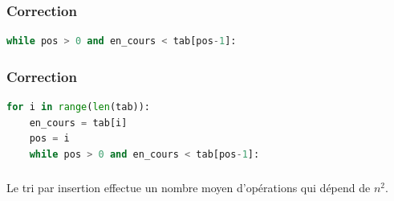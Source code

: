 \documentclass[svgnames,11pt]{beamer}
\begin{document}
\begin{frame}[fragile]
    \frametitle{Correction}

    \begin{center}
        \begin{lstlisting}[language=Python, basicstyle=\small, xrightmargin=1em]
while pos > 0 and en_cours < tab[pos-1]:
        \end{lstlisting}
        \end{center}
    \begin{center}
        \label{CODE}
        \end{center}

\end{frame}

\begin{frame}[fragile]
    \frametitle{Correction}

\begin{center}
\begin{lstlisting}[language=Python, basicstyle=\small, xrightmargin=1em]
for i in range(len(tab)):
    en_cours = tab[i]
    pos = i
    while pos > 0 and en_cours < tab[pos-1]:
\end{lstlisting}
\end{center}
    \begin{center}
        \label{CODE}
        \end{center}

\end{frame}
\begin{frame}
    \frametitle{}

    \begin{aretenir}[]
        Le tri par insertion effectue un nombre moyen d'opérations qui dépend de $n^2$.
    \end{aretenir}
\end{frame}
\end{document}
